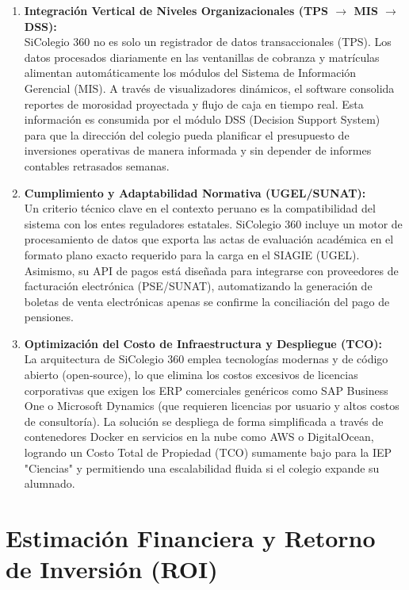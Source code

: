\documentclass[12pt,a4paper,oneside]{report}
\begin{document}
\begin{enumerate}
    \item \textbf{Integración Vertical de Niveles Organizacionales (TPS $\rightarrow$ MIS $\rightarrow$ DSS):} \\
    SiColegio 360 no es solo un registrador de datos transaccionales (TPS). Los datos procesados diariamente en las ventanillas de cobranza y matrículas alimentan automáticamente los módulos del Sistema de Información Gerencial (MIS). A través de visualizadores dinámicos, el software consolida reportes de morosidad proyectada y flujo de caja en tiempo real. Esta información es consumida por el módulo DSS (Decision Support System) para que la dirección del colegio pueda planificar el presupuesto de inversiones operativas de manera informada y sin depender de informes contables retrasados semanas.
    
    \item \textbf{Cumplimiento y Adaptabilidad Normativa (UGEL/SUNAT):} \\
    Un criterio técnico clave en el contexto peruano es la compatibilidad del sistema con los entes reguladores estatales. SiColegio 360 incluye un motor de procesamiento de datos que exporta las actas de evaluación académica en el formato plano exacto requerido para la carga en el SIAGIE (UGEL). Asimismo, su API de pagos está diseñada para integrarse con proveedores de facturación electrónica (PSE/SUNAT), automatizando la generación de boletas de venta electrónicas apenas se confirme la conciliación del pago de pensiones.
    
    \item \textbf{Optimización del Costo de Infraestructura y Despliegue (TCO):} \\
    La arquitectura de SiColegio 360 emplea tecnologías modernas y de código abierto (open-source), lo que elimina los costos excesivos de licencias corporativas que exigen los ERP comerciales genéricos como SAP Business One o Microsoft Dynamics (que requieren licencias por usuario y altos costos de consultoría). La solución se despliega de forma simplificada a través de contenedores Docker en servicios en la nube como AWS o DigitalOcean, logrando un Costo Total de Propiedad (TCO) sumamente bajo para la IEP "Ciencias" y permitiendo una escalabilidad fluida si el colegio expande su alumnado.
\end{enumerate}

\newpage

\section{Estimación Financiera y Retorno de Inversión (ROI)}
\end{document}
